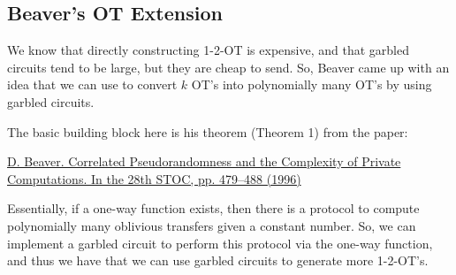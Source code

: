 \documentclass[11pt]{article}
\begin{document}
\newpage
\subsection{Beaver's OT Extension}
We know that directly constructing 1-2-OT is expensive,
and that garbled circuits tend to be large, but they are cheap to send.
So, Beaver came up with an idea that we can use to convert \(k\) OT's into polynomially many OT's by using garbled circuits.

The basic building block here is his theorem (Theorem 1) from the paper:

 \href{https://mit6875.github.io/PAPERS/BeaSTOC96.pdf}{D. Beaver. Correlated Pseudorandomness and the Complexity of Private Computations. In
the 28th STOC, pp. 479–488 (1996)}

Essentially, if a one-way function exists, then there is a protocol to compute polynomially many oblivious transfers given a constant number.
So, we can implement a garbled circuit to perform this protocol via the one-way function, and thus we have that we can use garbled circuits to generate more 1-2-OT's. 
\end{document}

